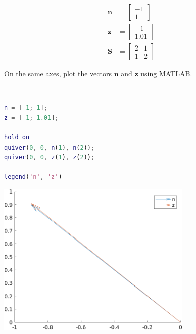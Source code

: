 \begin{align*}
    \boldsymbol{n} &= \begin{bmatrix}
        -1 \\ 1
    \end{bmatrix} \\
    \boldsymbol{z} &= \begin{bmatrix}
        -1 \\ 1.01
    \end{bmatrix} \\
    \boldsymbol{S} &= \begin{bmatrix}
        2 & 1 \\
        1 & 2
    \end{bmatrix}
\end{align*}

On the same axes, plot the vectors $\boldsymbol{n}$ and $\boldsymbol{z}$ using MATLAB.

\begin{solution} \
    \begin{lstlisting}[language=Matlab]
n = [-1; 1];
z = [-1; 1.01];

hold on
quiver(0, 0, n(1), n(2));
quiver(0, 0, z(1), z(2));

legend('n', 'z')
    \end{lstlisting}
    \begin{center}
        \includegraphics[width=0.7\textwidth]{img/e8p1.png}
    \end{center}
\end{solution}